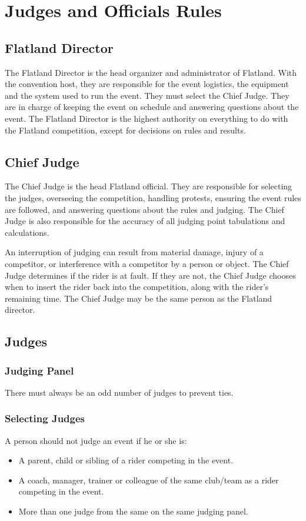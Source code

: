 \chapter{Judges and Officials Rules}

\section{Flatland Director}

The Flatland Director is the head organizer and administrator of Flatland.
With the convention host, they are responsible for the event logistics, the equipment and the system used to run the event.
They must select the Chief Judge.
They are in charge of keeping the event on schedule and answering questions about the event.
The Flatland Director is the highest authority on everything to do with the Flatland competition, except for decisions on rules and results.

\section{Chief Judge}

The Chief Judge is the head Flatland official.
They are responsible for selecting the judges, overseeing the competition, handling protests, ensuring the event rules are followed, and answering questions about the rules and judging.
The Chief Judge is also responsible for the accuracy of all judging point tabulations and calculations.

An interruption of judging can result from material damage, injury of a competitor, or interference with a competitor by a person or object.
The Chief Judge determines if the rider is at fault.
If they are not, the Chief Judge chooses when to insert the rider back into the competition, along with the rider's remaining time.
The Chief Judge may be the same person as the Flatland director.

\section{Judges}

\subsection{Judging Panel}

There must always be an odd number of judges to prevent ties.

\subsection{Selecting Judges}
A person should not judge an event if he or she is:
\begin{itemize}
\item A parent, child or sibling of a rider competing in the event.
\item A coach, manager, trainer or colleague of the same club/team as a rider competing in the event.
\item More than one judge from the same on the same judging panel.
\end{itemize}

